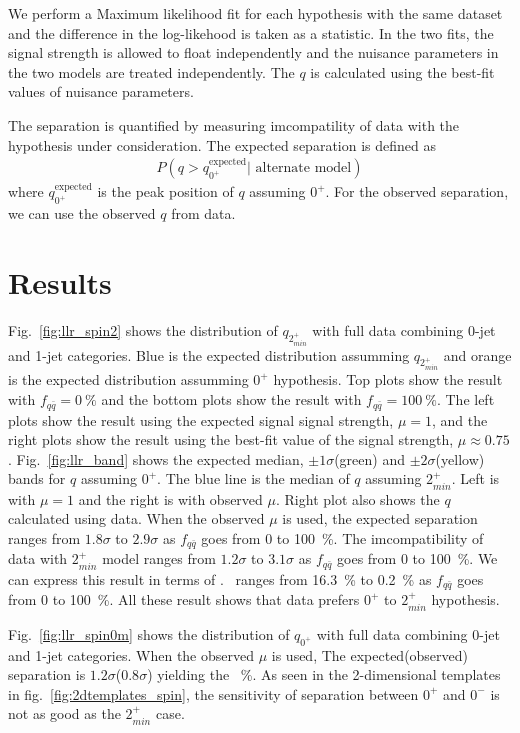 We perform a Maximum likelihood fit for each hypothesis with the same dataset 
and the difference in the log-likehood is taken as a statistic. 
In the two fits, the signal strength is allowed to float independently 
and the nuisance parameters in the two models are treated independently. 
The $q$ is calculated using the best-fit values of nuisance parameters. 

The separation is quantified by measuring imcompatility of data with 
the hypothesis under consideration. The expected separation is defined as  
\begin{eqnarray} 
P(q > q_{0^+}^{\textrm{expected}} | \textrm{ alternate model}) 
\end{eqnarray} 
where $q_{0^+}^{\textrm{expected}}$ is the peak position of $q$ assuming $0^+$.
For the observed separation, we can use the observed $q$ from data. 

\section{Results}

Fig.~\ref{fig:llr_spin2} shows the distribution of $q_{2_{min}^+}$ with full data 
combining 0-jet and 1-jet categories. Blue is the expected distribution assumming 
$q_{2_{min}^+}$ and orange is the expected distribution assumming $0^+$ hypothesis.
Top plots show the result with $f_{q\bar{q}}=0~\%$ and the bottom plots show 
the result with $f_{q\bar{q}}=100~\%$. The left plots show the result using the 
expected signal signal strength, $\mu=1$, 
and the right plots show the result using the best-fit value of the signal strength, 
$\mu \approx 0.75$.
Fig.~\ref{fig:llr_band} shows the expected median, $\pm1\sigma$(green) 
and  $\pm2\sigma$(yellow) bands for $q$ assuming $0^+$. 
The blue line is the median of $q$ assuming $2_{min}^+$.
Left is with $\mu=1$ and the right is with observed $\mu$.
Right plot also shows the $q$ calculated using data. 
When the observed $\mu$ is used, the expected separation ranges from 
$1.8\sigma$ to $2.9\sigma$ as $f_{q\bar{q}}$ goes from 0 to 100~\%.
The imcompatibility of data with $2_{min}^+$ model ranges from  
$1.2\sigma$ to $3.1\sigma$ as $f_{q\bar{q}}$ goes from 0 to 100~\%.
We can express this result in terms of \CLs. \CLs\ ranges from 
16.3~\% to 0.2~\% as $f_{q\bar{q}}$ goes from 0 to 100~\%.
All these result shows that data prefers $0^+$ to $2_{min}^+$ hypothesis.  

Fig.~\ref{fig:llr_spin0m} shows the distribution of $q_{0^+}$ with full data 
combining 0-jet and 1-jet categories. When the observed $\mu$ is used, 
The expected(observed) separation 
is $1.2\sigma$($0.8\sigma$) yielding the ~\%. 
As seen in the 2-dimensional templates in fig.~\ref{fig:2dtemplates_spin},
the sensitivity of separation between $0^+$ and $0^-$ is 
not as good as the $2_{min}^+$ case.

